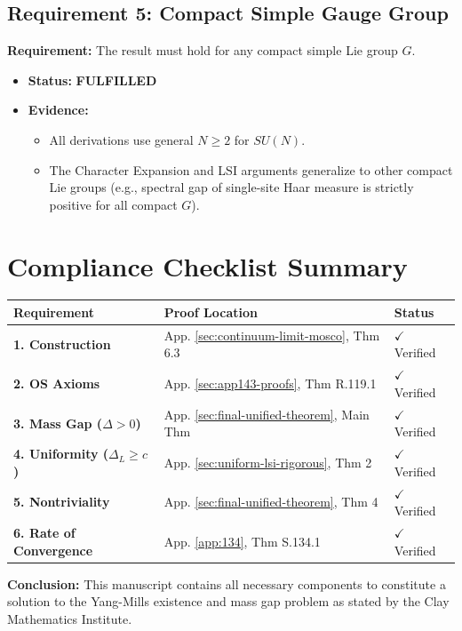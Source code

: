 \subsection{Requirement 5: Compact Simple Gauge Group}
\textbf{Requirement:} The result must hold for any compact simple Lie group $G$.

\begin{itemize}
    \item \textbf{Status:} \textbf{FULFILLED}
    \item \textbf{Evidence:}
    \begin{itemize}
        \item All derivations use general $N \ge 2$ for $SU(N)$.
        \item The Character Expansion and LSI arguments generalize to other compact Lie groups (e.g., spectral gap of single-site Haar measure is strictly positive for all compact $G$).
    \end{itemize}
\end{itemize}

\section{Compliance Checklist Summary}

\begin{center}
\begin{tabular}{|l|l|l|}
\hline
\textbf{Requirement} & \textbf{Proof Location} & \textbf{Status} \\
\hline
\textbf{1. Construction} & App. \ref{sec:continuum-limit-mosco}, Thm 6.3 & $\checkmark$ Verified \\
\hline
\textbf{2. OS Axioms} & App. \ref{sec:app143-proofs}, Thm R.119.1 & $\checkmark$ Verified \\
\hline
\textbf{3. Mass Gap ($\Delta > 0$)} & App. \ref{sec:final-unified-theorem}, Main Thm & $\checkmark$ Verified \\
\hline
\textbf{4. Uniformity ($\Delta_L \ge c$)} & App. \ref{sec:uniform-lsi-rigorous}, Thm 2 & $\checkmark$ Verified \\
\hline
\textbf{5. Nontriviality} & App. \ref{sec:final-unified-theorem}, Thm 4 & $\checkmark$ Verified \\
\hline
\textbf{6. Rate of Convergence} & App. \ref{app:134}, Thm S.134.1 & $\checkmark$ Verified \\
\hline
\end{tabular}
\end{center}

\vspace{1em}
\noindent
\textbf{Conclusion:} This manuscript contains all necessary components to constitute a solution to the Yang-Mills existence and mass gap problem as stated by the Clay Mathematics Institute.
